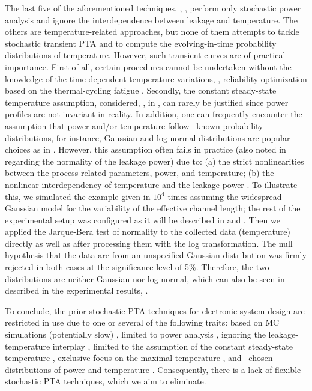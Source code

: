 The last five of the aforementioned techniques, \ie, \cite{shen2009, bhardwaj2006, bhardwaj2008, vrudhula2006, ghanta2006}, perform only stochastic power analysis and ignore the interdependence between leakage and temperature.
The others are temperature-related approaches, but none of them attempts to tackle stochastic transient PTA and to compute the evolving-in-time probability distributions of temperature.
However, such transient curves are of practical importance.
First of all, certain procedures cannot be undertaken without the knowledge of the time-dependent temperature variations, \eg, reliability optimization based on the thermal-cycling fatigue \cite{ukhov2012}.
Secondly, the constant steady-state temperature assumption, considered, \eg, in \cite{juan2011, juan2012, huang2009, lee2013}, can rarely be justified since power profiles are not invariant in reality.
In addition, one can frequently encounter the assumption that power and/or temperature follow \apriori\ known probability distributions, for instance, Gaussian and log-normal distributions are popular choices as in \cite{srivastava2010, juan2012, bhardwaj2006}.
However, this assumption often fails in practice (also noted in \cite{juan2012} regarding the normality of the leakage power) due to: (a) the strict nonlinearities between the process-related parameters, power, and temperature; (b) the nonlinear interdependency of temperature and the leakage power \cite{liu2007}.
To illustrate this, we simulated the example given in  $10^4$ times assuming the widespread Gaussian model for the variability of the effective channel length; the rest of the experimental setup was configured as it will be described in  and .
Then we applied the Jarque-Bera test of normality to the collected data (temperature) directly as well as after processing them with the log transformation.
The null hypothesis that the data are from an unspecified Gaussian distribution was firmly rejected in both cases at the significance level of 5\%.
Therefore, the two distributions are neither Gaussian nor log-normal, which can also be seen in  described in the experimental results, .

To conclude, the prior stochastic PTA techniques for electronic system design are restricted in use due to one or several of the following traits: based on MC simulations (potentially slow) \cite{chandra2010}, limited to power analysis \cite{chandra2010, shen2009, bhardwaj2006, bhardwaj2008, vrudhula2006, ghanta2006}, ignoring the leakage-temperature interplay \cite{huang2009, shen2009, bhardwaj2006, bhardwaj2008, vrudhula2006, ghanta2006}, limited to the assumption of the constant steady-state temperature \cite{juan2011, juan2012, huang2009, lee2013}, exclusive focus on the maximal temperature \cite{juan2011}, and \apriori\ chosen distributions of power and temperature \cite{srivastava2010, juan2012, bhardwaj2006}.
Consequently, there is a lack of flexible stochastic PTA techniques, which we aim to eliminate.
